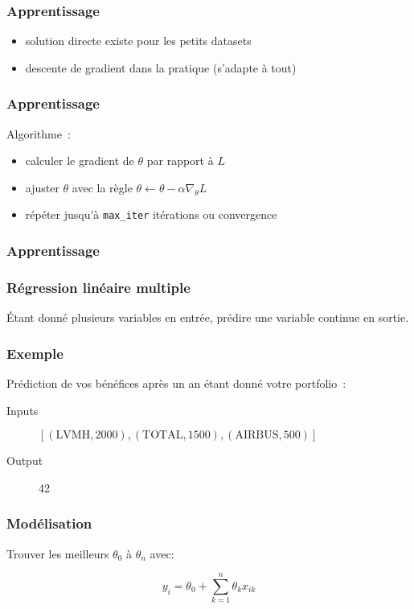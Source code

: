 \documentclass{formation}
\begin{document}
\begin{frame}
  \frametitle{Apprentissage}

  \begin{itemize}
  \item solution directe existe pour les petits datasets
  \item descente de gradient dans la pratique (s'adapte à tout)
  \end{itemize}
\end{frame}

\begin{frame}
  \frametitle{Apprentissage}

  Algorithme :
  \begin{itemize}
  \item calculer le gradient de $\theta$ par rapport à $L$
  \item ajuster $\theta$ avec la règle
    $\theta \leftarrow \theta - \alpha \nabla_\theta L$
  \item répéter jusqu'à \texttt{max\_iter} itérations ou convergence
  \end{itemize}
\end{frame}

\begin{frame}
  \frametitle{Apprentissage}

\end{frame}

\begin{frame}
  \frametitle{Régression linéaire multiple}

  Étant donné plusieurs variables en entrée, prédire une variable
  continue en sortie.

\end{frame}

\begin{frame}
  \frametitle{Exemple}
  Prédiction de vos bénéfices après un an étant donné votre
  portfolio :
  \begin{description}
  \item[Inputs] $[(\text{LVMH}, 2000), (\text{TOTAL}, 1500), (\text{AIRBUS}, 500)]$
    \item[Output] 42
  \end{description}
\end{frame}

\begin{frame}
  \frametitle{Modélisation}
    Trouver les meilleurs $\theta_0$ à $\theta_n$ avec:

  \[
    y_i = \theta_0 + \sum_{k = 1}^{n}\theta_kx_{ik}
  \]
\end{frame}
\end{document}

